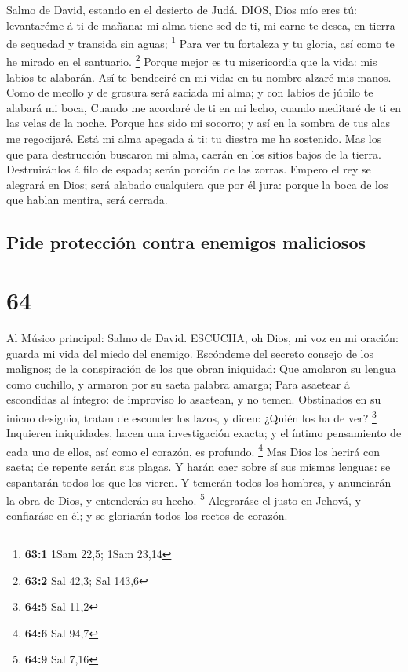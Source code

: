  Salmo de David, estando en el desierto de Judá. DIOS, Dios
mío eres tú: levantaréme á ti de mañana: mi alma tiene sed de ti, mi
carne te desea, en tierra de sequedad y transida sin aguas; \footnote{\textbf{63:1}
  1Sam 22,5; 1Sam 23,14}  Para ver tu fortaleza y tu gloria,
así como te he mirado en el santuario. \footnote{\textbf{63:2} Sal 42,3;
  Sal 143,6}  Porque mejor es tu misericordia que la vida:
mis labios te alabarán.  Así te bendeciré en mi vida: en tu
nombre alzaré mis manos.  Como de meollo y de grosura será
saciada mi alma; y con labios de júbilo te alabará mi boca, 
Cuando me acordaré de ti en mi lecho, cuando meditaré de ti en las velas
de la noche.  Porque has sido mi socorro; y así en la sombra
de tus alas me regocijaré.  Está mi alma apegada á ti: tu
diestra me ha sostenido.  Mas los que para destrucción
buscaron mi alma, caerán en los sitios bajos de la tierra. 
Destruiránlos á filo de espada; serán porción de las zorras.
 Empero el rey se alegrará en Dios; será alabado cualquiera
que por él jura: porque la boca de los que hablan mentira, será cerrada.

\hypertarget{pide-protecciuxf3n-contra-enemigos-maliciosos}{%
\subsection{Pide protección contra enemigos
maliciosos}\label{pide-protecciuxf3n-contra-enemigos-maliciosos}}

\hypertarget{section-63}{%
\section{64}\label{section-63}}

 Al Músico principal: Salmo de David. ESCUCHA, oh Dios, mi
voz en mi oración: guarda mi vida del miedo del enemigo. 
Escóndeme del secreto consejo de los malignos; de la conspiración de los
que obran iniquidad:  Que amolaron su lengua como cuchillo,
y armaron por su saeta palabra amarga;  Para asaetear á
escondidas al íntegro: de improviso lo asaetean, y no temen.
 Obstinados en su inicuo designio, tratan de esconder los
lazos, y dicen: ¿Quién los ha de ver? \footnote{\textbf{64:5} Sal 11,2}
 Inquieren iniquidades, hacen una investigación exacta; y el
íntimo pensamiento de cada uno de ellos, así como el corazón, es
profundo. \footnote{\textbf{64:6} Sal 94,7}  Mas Dios los
herirá con saeta; de repente serán sus plagas.  Y harán caer
sobre sí sus mismas lenguas: se espantarán todos los que los vieren.
 Y temerán todos los hombres, y anunciarán la obra de Dios,
y entenderán su hecho. \footnote{\textbf{64:9} Sal 7,16} 
Alegraráse el justo en Jehová, y confiaráse en él; y se gloriarán todos
los rectos de corazón.

